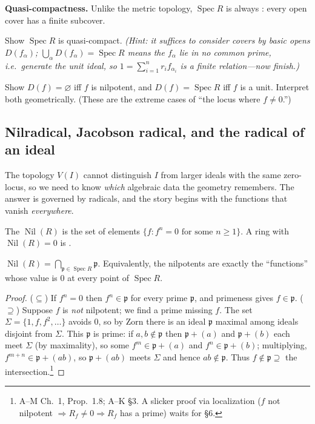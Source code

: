 \documentclass[11pt]{article}
\DeclareMathOperator{\Spec}{Spec}
\DeclareMathOperator{\Nil}{Nil}
\newcommand{\mfp}{\mathfrak{p}}
\begin{document}
\textbf{Quasi-compactness.} Unlike the metric topology, $\Spec R$ is always
: every open cover has a finite subcover.

\begin{xca}[\textbf{(classic)} $\Spec R$ is quasi-compact]
Show $\Spec R$ is quasi-compact. \emph{(Hint: it suffices to consider covers by basic opens
$D(f_\alpha)$; $\bigcup_\alpha D(f_\alpha)=\Spec R$ means the $f_\alpha$ lie in no common
prime, i.e.\ generate the unit ideal, so $1=\sum_{i=1}^n r_i f_{\alpha_i}$ is a finite
relation---now finish.)}
\end{xca}

\begin{xca}
Show $D(f)=\varnothing$ iff $f$ is nilpotent, and $D(f)=\Spec R$ iff $f$ is a unit. Interpret
both geometrically. (These are the extreme cases of ``the locus where $f\neq 0$.'')
\end{xca}

\subsection{Nilradical, Jacobson radical, and the radical of an ideal}

The topology $V(I)$ cannot distinguish $I$ from larger ideals with the same zero-locus, so we
need to know \emph{which} algebraic data the geometry remembers. The answer is governed by
radicals, and the story begins with the functions that vanish \emph{everywhere}.

\begin{ddefinition}
The  $\Nil(R)$ is the set of  elements
$\{f: f^n=0 \text{ for some } n\ge1\}$. A ring with $\Nil(R)=0$ is .
\end{ddefinition}

\begin{ttheorem}
$\Nil(R)=\bigcap_{\mfp\in\Spec R}\mfp$. Equivalently, the nilpotents are exactly the
``functions'' whose value is $0$ at every point of $\Spec R$.
\end{ttheorem}

\begin{proof}
($\subseteq$) If $f^n=0$ then $f^n\in\mfp$ for every prime $\mfp$, and primeness gives
$f\in\mfp$. ($\supseteq$) Suppose $f$ is \emph{not} nilpotent; we find a prime missing $f$.
The set $\Sigma=\{1,f,f^2,\dots\}$ avoids $0$, so by Zorn there is an ideal $\mfp$ maximal
among ideals disjoint from $\Sigma$. This $\mfp$ is prime: if $a,b\notin\mfp$ then
$\mfp+(a)$ and $\mfp+(b)$ each meet $\Sigma$ (by maximality), so some $f^m\in\mfp+(a)$ and
$f^n\in\mfp+(b)$; multiplying, $f^{m+n}\in\mfp+(ab)$, so $\mfp+(ab)$ meets $\Sigma$ and hence
$ab\notin\mfp$. Thus $f\notin\mfp\supseteq$ the intersection.\footnote{A--M Ch.~1, Prop.\ 1.8;
A--K \S3. A slicker proof via localization ($f$ not nilpotent $\Rightarrow R_f\neq 0
\Rightarrow R_f$ has a prime) waits for \S6.}
\end{proof}
\end{document}
